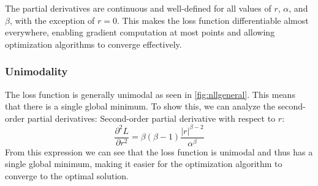 \documentclass[letterpaper, 10 pt, conference]{ieeeconf}  %
\begin{document}
The partial derivatives are continuous and well-defined for all values of $r$, $\alpha
$, and $\beta$, with the exception of $r = 0$. This makes the loss function differentiable almost everywhere, enabling gradient computation at most points and allowing optimization algorithms to converge effectively.

\subsubsection{Unimodality} 
The loss function is generally unimodal as seen in \cref{fig:nllgeneral}. This means that there is a single global minimum. To show this, we can analyze the second-order partial derivatives:
Second-order partial derivative with respect to $r$:
\begin{equation*}
    \frac{\partial^2 L}{\partial r^2} = \beta (\beta-1) \frac{|r|^{\beta-2}}{\alpha^{\beta}}
\end{equation*}
From this expression we can see that the loss function is unimodal and thus has a single global minimum, making it easier for the optimization algorithm to converge to the optimal solution.


%
%
%
%
%
%
%
%
%
%
%
\end{document}
